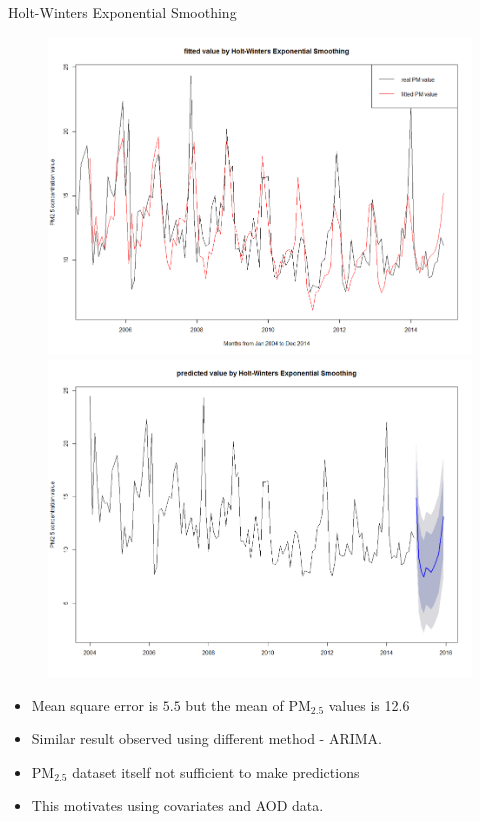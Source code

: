 \documentclass[notheorems,envcountsect,allowframebreaks,xcolor=svgnames,8pt]{beamer}
\begin{document}
\begin{frame}{Holt-Winters Exponential Smoothing}
\begin{figure}
\centering
\includegraphics[scale=0.25]{figs/ts2.png} \vspace{2mm}
\includegraphics[scale=0.25]{figs/ts3.png}
\end{figure}
\begin{itemize}
\item Mean square error is $5.5$ but the mean of PM$_{2.5}$ values is 12.6
\item Similar result observed using different method - ARIMA.
\item PM$_{2.5}$ dataset itself not sufficient to make predictions
\item This motivates using covariates and AOD data.
\end{itemize}  
\end{frame}
\end{document}
